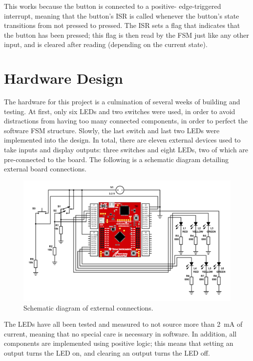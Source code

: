 \documentclass{article}
\begin{document}
This works because the button is connected to a positive-
edge-triggered interrupt, meaning that the button's ISR is
called whenever the button's state transitions from
not pressed to pressed. The ISR sets a flag that indicates
that the button has been pressed; this flag is then read
by the FSM just like any other input, and is cleared after
reading (depending on the current state).

\section{Hardware Design} The hardware for this project
is a culmination of several weeks of building and testing.
At first, only six LEDs and two switches were used, in order
to avoid distractions from having too many connected components,
in order to perfect the software FSM structure. Slowly, the
last switch and last two LEDs were implemented into the design.
In total, there are eleven external devices used to take inputs
and display outputs: three switches and eight LEDs, two of
which are pre-connected to the board. The following is a
schematic diagram detailing external board connections.

\begin{figure}[H]
    \centering
    \includegraphics[width=\textwidth]{Images/schemeit-project}
    \caption{Schematic diagram of external connections.}
    \label{schematic}
\end{figure}

The LEDs have all been tested
and measured
to not source more than
\SI{2}{\milli\ampere} of current, meaning that no special
care is necessary in software. In addition, all components
are implemented using positive logic; this means that
setting an output turns the LED on, and clearing an output
turns the LED off.
\end{document}
